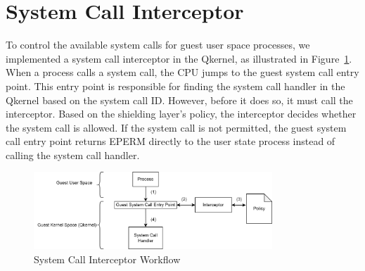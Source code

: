 \section{System Call Interceptor}
\label{sec:design_Interceptor}
To control the available system calls for guest user space processes, we implemented a system call interceptor in the Qkernel, as illustrated in Figure~\ref{fig:syscall_interceptor}. When a process calls a system call, the CPU jumps to the guest system call entry point. 
This entry point is responsible for finding the system call handler in the Qkernel based on the system call ID. However, before it does so, it must call the interceptor. Based on the shielding layer's policy, the interceptor decides whether the 
system call is allowed. If the system call is not permitted, the guest system call entry point returns EPERM directly to the user state process instead of calling the system call handler.

\begin{figure}[H]
    \centering
    \includegraphics[width=0.8\textwidth]{images/syscall_interceptor.png}
    \caption[System Call Interceptor Workflow]{System Call Interceptor Workflow}
    \label{fig:syscall_interceptor}
\end{figure}

